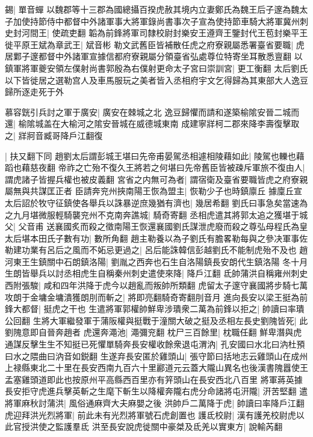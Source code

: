 錫|{
	單音蟬}
以魏郡等十三郡為國總攝百揆虎赦其境内立妻鄭氏為魏王后子邃為魏太子加使持節侍中都督中外諸軍事大將軍錄尚書事次子宣為使持節車騎大將軍冀州刺史封河間王|{
	使疏吏翻}
韜為前鋒將軍司隸校尉封樂安王遵齊王鑒封代王苞封樂平王徙平原王斌為章武王|{
	斌音彬}
勒文武舊臣皆補散任虎之府寮親屬悉署臺省要職|{
	虎居鄴子邃都督中外諸軍宣據信都府寮親屬分領臺省弘處尊位特寄坐耳散悉亶翻}
以鎮軍將軍夔安領左僕射尚書郭殷為右僕射更命太子宮曰崇訓宮|{
	更工衡翻}
太后劉氏以下皆徙居之選勒宫人及車馬服玩之美者皆入丞相府宇文乞得歸為其東部大人逸豆歸所逐走死于外

慕容皝引兵討之軍于廣安|{
	廣安在棘城之北}
逸豆歸懼而請和遂築榆隂安晉二城而還|{
	榆隂城盖在大榆河之隂安晉城在威德城東南}
成建寧牂柯二郡來降李壽復擊取之|{
	牂牁音臧哥降戶江翻復}


|{
	扶又翻下同}
趙劉太后謂彭城王堪曰先帝甫晏駕丞相遽相陵藉如此|{
	陵駕也轢也藉蹈也藉慈夜翻}
帝祚之亡殆不復久王將若之何堪曰先帝舊臣皆被疎斥軍旅不復由人|{
	謂虎諸子皆握兵權也被皮義翻}
宮省之内無可為者|{
	謂宿衛及臺省要職皆虎之府寮親屬無與共謀匡正者}
臣請奔兖州挾南陽王恢為盟主|{
	恢勒少子也時鎮廪丘}
據廩丘宣太后詔於牧守征鎮使各舉兵以誅暴逆庶幾猶有濟也|{
	幾居希翻}
劉氏曰事急矣當速為之九月堪微服輕騎襲兖州不克南奔譙城|{
	騎奇寄翻}
丞相虎遣其將郭太追之獲堪于城父|{
	父音甫}
送襄國炙而殺之徵南陽王恢還襄國劉氏謀泄虎廢而殺之尊弘母程氏為皇太后堪本田氏子數有功|{
	數所角翻}
趙主勒養以為子劉氏有膽畧勒每與之參决軍事佐勒建功業有呂后之風而不妬忌更過之|{
	呂后能誅韓信彭越劉氏不能制虎殆不及也}
趙河東王生鎮關中石朗鎮洛陽|{
	劉胤之西奔也石生自洛陽鎮長安朗代生鎮洛陽}
冬十月生朗皆舉兵以討丞相虎生自稱秦州刺史遣使來降|{
	降戶江翻}
氐帥蒲洪自稱雍州刺史西附張駿|{
	咸和四年洪降于虎今以趙亂而叛帥所類翻}
虎留太子邃守襄國將步騎七萬攻朗于金墉金墉潰獲朗刖而斬之|{
	將即亮翻騎奇寄翻刖音月}
進向長安以梁王挺為前鋒大都督|{
	挺虎之干也}
生遣將軍郭權帥鮮卑涉璝衆二萬為前鋒以拒之|{
	帥讀曰率璝公回翻}
生將大軍繼發軍于蒲阪權與挺戰于潼關大破之挺及丞相左長史劉隗皆死|{
	此劉隗意即自晉奔趙者}
虎還奔澠池|{
	澠彌兖翻}
枕尸三百餘里|{
	枕職任翻}
鮮卑潛與虎通謀反擊生生不知挺已死懼單騎奔長安權收餘衆退屯渭汭|{
	孔安國曰水北曰汭杜預曰水之隈曲曰汭音如鋭翻}
生遂弃長安匿於雞頭山|{
	張守節曰括地志云雞頭山在成州上禄縣東北二十里在長安西南九百六十里酈道元云蓋大隴山異名也後漢書隗囂使王孟塞雞頭道即此也按原州平高縣西百里亦有笄頭山在長安西北八百里}
將軍蔣英據長安拒守虎進兵擊英斬之生麾下斬生以降權奔隴右虎分命諸將屯汧隴|{
	汧苦堅翻}
遣將軍麻秋討蒲洪|{
	風俗通麻齊大夫麻嬰之後}
洪帥戶二萬降于虎|{
	帥讀曰率降戶江翻}
虎迎拜洪光烈將軍|{
	前此未有光烈將軍號石虎創置也}
護氐校尉|{
	漢有護羌校尉虎以此官授洪使之監護羣氐}
洪至長安說虎徙關中豪桀及氐羌以實東方|{
	說輸芮翻}

